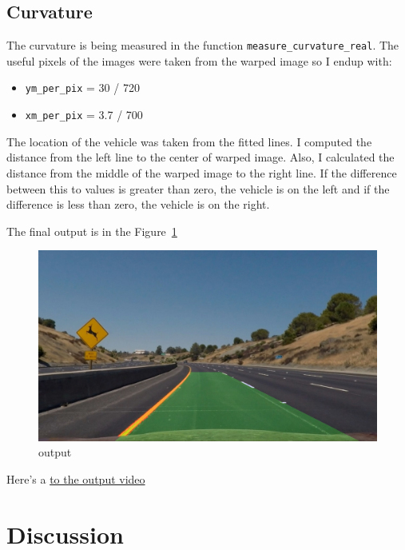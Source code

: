 \documentclass[11pt, a4paper]{article}
\begin{document}
\subsection{Curvature}%
\label{sub:curvature}

The curvature is being measured in the function \texttt{measure\_curvature\_real}. The useful pixels of the images were taken from the warped image so I endup with:

\begin{itemize}
	\item \texttt{ym\_per\_pix} = 30 / 720
	\item \texttt{xm\_per\_pix} = 3.7 / 700
\end{itemize}

The location of the vehicle was taken from the fitted lines. I computed the distance from the left line to the center of warped image. Also, I calculated the distance from the middle of the warped image to the right line. If the difference between this to values is greater than zero, the vehicle is on the left and if the difference is less than zero, the vehicle is on the right.



The final output is in the Figure~\ref{fig:output}

\begin{figure}[htb!]
	\centering
	\includegraphics[width=0.8\linewidth]{output}
	\caption{output}
	\label{fig:output}
\end{figure}


Here's a \href{https://github.com/SamuelNavarro/SelfDriving/tree/master/AdvancedLaneFinding/Project/test_videos_output}{to the output video}






\section{Discussion}
\label{sec:discussion}
\end{document}
